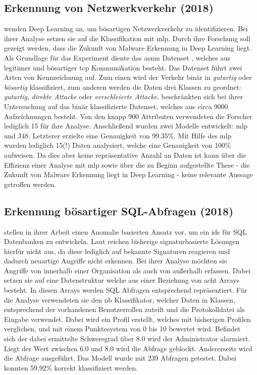 \documentclass[
    12pt, %
    DIV10,
    ngerman, %
    a4paper, %
    oneside, %
    titlepage, %
    parskip=half, %
    headings=normal, %
    listof=totoc, %
    bibliography=totoc, %
    index=totoc, %
    captions=tableheading, %
    final %
]{scrreprt}
\begin{document}
\subsection{Erkennung von Netzwerkverkehr (2018)}\label{asnm}
\textcite{Teoh2018} wenden Deep Learning an, um bösartigen Netzwerkverkehr zu identifizieren. Bei ihrer Analyse setzen sie auf die Klassifikation mit \ac{mlp}. Durch ihre Forschung soll gezeigt werden, dass die Zukunft von Malware Erkennung in Deep Learning liegt. Als Grundlage für das Experiment diente das \ac{asnm} Datenset \parencite{phdthesis}, welches aus legitimer und bösartiger \ac{tcp} Kommunikation besteht. Das Datenset führt zwei Arten von Kennzeichnung auf. Zum einen wird der Verkehr binär in \emph{gutartig} oder \emph{bösartig} klassifiziert, zum anderen werden die Daten drei Klassen zu geordnet: \emph{gutartig}, \emph{direkte Attacke} oder \emph{verschleierte Attacke}. \textcite{Teoh2018} beschränkten sich bei ihrer Untersuchung auf das binär klassifizierte Datenset, welches aus circa 9000 Aufzeichnungen besteht. Von den knapp 900 Attributen verwendeten die Forscher lediglich 15 für ihre Analyse. Anschlie{\ss}end wurden zwei Modelle entwickelt: \ac{mlp} und J48. Letzterer erzielte eine Genauigkeit von 99.35\%. Mit Hilfe des \ac{mlp} wurden lediglich 15(!) Daten analysiert, welche eine Genauigkeit von 100\% aufweisen. Da dies aber keine repräsentative Anzahl an Daten ist kann über die Effizienz einer Analyse mit \ac{mlp} sowie über die zu Beginn aufgestellte These - die Zukunft von Malware Erkennung liegt in Deep Learning - keine relevante Aussage getroffen werden. 
%
\subsection{Erkennung bösartiger SQL-Abfragen (2018)}
\textcite{Jayaprakash2018} stellen in ihrer Arbeit einen Anomalie basierten Ansatz vor, um ein \ac{ids} für SQL Datenbanken zu entwickeln. Laut \textcite{Jayaprakash2018} reichen bisherige signaturbasierte Lösungen hierfür nicht aus, da diese lediglich auf bekannte Signaturen reagieren und dadurch neuartige Angriffe nicht erkennen. Bei ihrer Analyse möchten sie Angriffe von innerhalb einer Organisation als auch von au{\ss}erhalb erfassen. Dabei setzen sie auf eine Datenstruktur welche aus einer Beziehung von acht Arrays besteht. In diesen Arrays werden SQL Abfragen entsprechend repräsentiert. Für die Analyse verwendeten sie den \acl{nb} Klassifikator, welcher Daten in Klassen, entsprechend der vorhandenen Benutzerrollen zuteilt und die Protokolldatei als Eingabe verwendet. Dabei wird ein Profil erstellt, welches mit bisherigen Profilen verglichen, und mit einem Punktesystem von 0 bis 10 bewertet wird. Befindet sich der dabei ermittelte Schweregrad über 8.0 wird der Administrator alarmiert. Liegt der Wert zwischen 6.0 und 8.0 wird die Abfrage geblockt. Andererseits wird die Abfrage ausgeführt. Das Modell wurde mit 239 Abfragen getestet. Dabei konnten 59.92\% korrekt klassifiziert werden.
%
\end{document}
